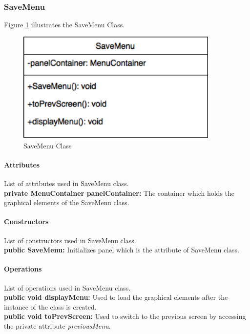 \documentclass[12pt]{article} %
\begin{document}


\subsubsection{SaveMenu} %

Figure \ref{fig:savemenu} illustrates the SaveMenu Class.
\begin{figure}[h!]
   \centering
   \vspace{10pt}%
   \includegraphics[width=10cm]{savemenu.png}
   \caption{SaveMenu Class}
   \label{fig:savemenu}
\end{figure}

\paragraph{Attributes \\}

List of attributes used in SaveMenu class.\\
\textbf{private MenuContainer panelContainer:} The container which holds the graphical elements of the SaveMenu class. 

\paragraph{Constructors \\}
List of constructors used in SaveMenu class.\\
\textbf{public SaveMenu:} Initializes panel which is the attribute of SaveMenu class.


\paragraph{Operations \\}
List of operations used in SaveMenu class.\\
\textbf{public void displayMenu:} Used to load the graphical elements after the instance of the class is created.\\
\textbf{public void toPrevScreen:} Used to switch to the previous screen by accessing the private attribute \textit{previousMenu}.
\end{document}
